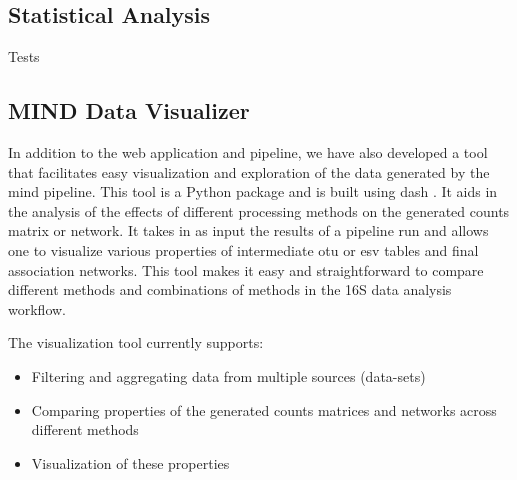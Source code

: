   \subsection*{Statistical Analysis}

    Tests

  \subsection*{MIND Data Visualizer}

    In addition to the web application and pipeline, we have also developed a tool that facilitates easy visualization and exploration of the data generated by the \ac{mind} pipeline.
    This tool is a Python package and is built using dash \cite{dash}.
    It aids in the analysis of the effects of different processing methods on the generated counts matrix or network.
    It takes in as input the results of a pipeline run and allows one to visualize various properties of intermediate \ac{otu} or \ac{esv} tables and final association networks.
    This tool makes it easy and straightforward to compare different methods and combinations of methods in the 16S data analysis workflow.

    The visualization tool currently supports:
    \begin{itemize}
      \item Filtering and aggregating data from multiple sources (data-sets)
      \item Comparing properties of the generated counts matrices and networks across different methods
      \item Visualization of these properties
    \end{itemize}
